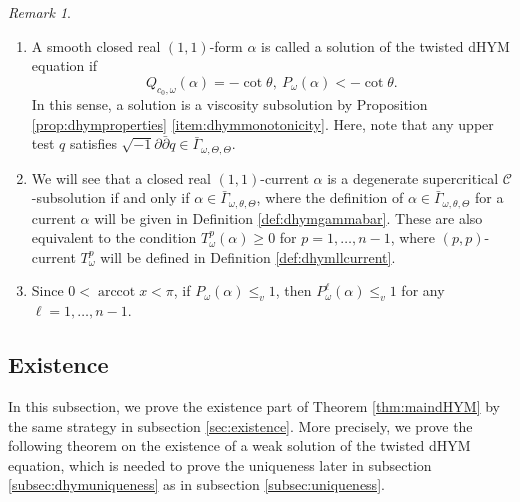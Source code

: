 \documentclass{amsart}
\numberwithin{equation}{section}
\theoremstyle{plain}
\theoremstyle{definition}
\theoremstyle{remark}
\newtheorem{remark}[equation]{Remark}
\newcommand{\delb}{\sqrt{-1}\partial\bar{\partial}}
\begin{document}
\begin{remark}\label{rem:dhymvisc}
    \begin{enumerate}[label={\upshape(\roman*)}]
        \item A smooth closed real $(1,1)$-form $\alpha$ is called a solution of the twisted dHYM equation if
        \begin{equation*}
            Q_{c_0,\omega}(\alpha)=-\cot\theta,\ P_\omega(\alpha)<-\cot\theta.
        \end{equation*}
        In this sense, a solution is a viscosity subsolution by Proposition \ref{prop:dhymproperties} \ref{item:dhymmonotonicity}. Here, note that any upper test $q$ satisfies $\delb q\in\bar{\Gamma}_{\omega,\Theta,\Theta}$.
        \item We will see that a closed real $(1,1)$-current $\alpha$ is a degenerate supercritical $\mathcal{C}$-subsolution if and only if $\alpha\in\bar{\Gamma}_{\omega,\theta,\Theta}$, where the definition of $\alpha\in\bar{\Gamma}_{\omega,\theta,\Theta}$ for a current $\alpha$ will be given in Definition \ref{def:dhymgammabar}. These are also equivalent to the condition $T^p_\omega(\alpha)\ge0$ for $p=1,\dots,n-1$, where $(p,p)$-current $T^p_\omega$ will be defined in Definition \ref{def:dhymllcurrent}. 
        \item\label{item:dhymmonovisc} Since $0<\operatorname{arccot}x<\pi$, if $P_\omega(\alpha)\le_v1$, then $P^\ell_\omega(\alpha)\le_v1$ for any $\ell=1,\dots,n-1$.
    \end{enumerate}
\end{remark}

\subsection{Existence}
In this subsection, we prove the existence part of Theorem \ref{thm:maindHYM} by the same strategy in subsection \ref{sec:existence}. More precisely, we prove the following theorem on the existence of a weak solution of the twisted dHYM equation, which is needed to prove the uniqueness later in subsection \ref{subsec:dhymuniqueness} as in subsection \ref{subsec:uniqueness}.
\end{document}
